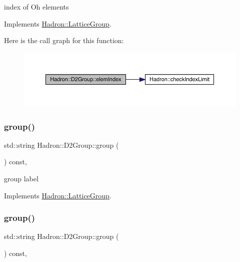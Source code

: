index of Oh elements 

Implements \mbox{\hyperlink{structHadron_1_1LatticeGroup_afb8e3ee60de059f75bce1044c694e1e8}{Hadron\+::\+Lattice\+Group}}.

Here is the call graph for this function\+:
\nopagebreak
\begin{figure}[H]
\begin{center}
\leavevmode
\includegraphics[width=350pt]{d8/de7/structHadron_1_1D2Group_aa7676a51e002eb654648c4d84585d6da_cgraph}
\end{center}
\end{figure}
\mbox{\label{structHadron_1_1D2Group_aa6d99edf22f99550602f38437aadd890}} 
\subsubsection{\texorpdfstring{group()}{group()}\hspace{0.1cm}{\footnotesize\ttfamily [1/2]}}
{\footnotesize\ttfamily std\+::string Hadron\+::\+D2\+Group\+::group (\begin{DoxyParamCaption}{ }\end{DoxyParamCaption}) const\hspace{0.3cm}{\ttfamily [inline]}, {\ttfamily [virtual]}}

group label 

Implements \mbox{\hyperlink{structHadron_1_1LatticeGroup_a82208a322bf1b1db489f16af38e70087}{Hadron\+::\+Lattice\+Group}}.

\mbox{\label{structHadron_1_1D2Group_aa6d99edf22f99550602f38437aadd890}} 
\subsubsection{\texorpdfstring{group()}{group()}\hspace{0.1cm}{\footnotesize\ttfamily [2/2]}}
{\footnotesize\ttfamily std\+::string Hadron\+::\+D2\+Group\+::group (\begin{DoxyParamCaption}{ }\end{DoxyParamCaption}) const\hspace{0.3cm}{\ttfamily [inline]}, {\ttfamily [virtual]}}

